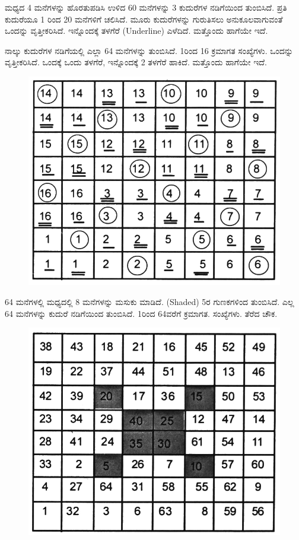 ಮಧ್ಯದ 4 ಮನೆಗಳನ್ನು ಹೊರತುಪಡಿಸಿ ಉಳಿದ 60 ಮನೆಗಳನ್ನು 3 ಕುದುರೆಗಳ ನಡಿಗೆಯಿಂದ ತುಂಬಿಸಿದೆ. ಪ್ರತಿ ಕುದುರೆಯೂ 1 ರಿಂದ 20 ಮನೆಗಳಿಗೆ ಚಲಿಸಿದೆ. ಮೂರು ಕುದುರೆಗಳನ್ನು ಗುರುತಿಸಲು ಅನುಕೂಲವಾಗುವಂತೆ ಒಂದನ್ನು ವೃತ್ತೀಕರಿಸಿದೆ. ಇನ್ನೊಂದಕ್ಕೆ ತಳಗೆರೆ (Underline) ಎಳೆದಿದೆ. ಮತ್ತೊಂದು ಹಾಗೆಯೇ ಇದೆ.

ನಾಲ್ಕು ಕುದುರೆಗಳ ನಡಿಗೆಯಲ್ಲಿ ಎಲ್ಲಾ 64 ಮನೆಗಳನ್ನು ತುಂಬಿಸಿದೆ. 1ರಿಂದ 16 ಕ್ರಮಾಗತ ಸಂಖ್ಯೆಗಳು. ಒಂದನ್ನು ವೃತ್ತೀಕರಿಸಿದೆ. ಒಂದಕ್ಕೆ ಒಂದು ತಳಗೆರೆ, ಇನ್ನೊಂದಕ್ಕೆ 2 ತಳಗೆರೆ ಹಾಕಿದೆ. ಮತ್ತೊಂದು ಹಾಗೆಯೇ ಇದೆ.
\begin{figure}[H]
\includegraphics{src/figures/chap6/fig6.19.jpg}
\end{figure}

64 ಮನೆಗಳಲ್ಲಿ ಮಧ್ಯದಲ್ಲಿ 8 ಮನೆಗಳನ್ನು ಮಸುಕು ಮಾಡಿದೆ. (Shaded) 5ರ ಗುಣಕಗಳಿಂದ ತುಂಬಿಸಿದೆ. ಎಲ್ಲ 64 ಮನೆಗಳನ್ನು ಕುದುರೆ ನಡಿಗೆಯಿಂದ ತುಂಬಿಸಿದೆ. 1ರಿಂದ 64ವರೆಗೆ ಕ್ರಮಾಗತ. ಸಂಖ್ಯೆಗಳು. ತೆರೆದ ಚೌಕ.
\begin{figure}[H]
\includegraphics{src/figures/chap6/fig6.20.jpg}
\end{figure}

